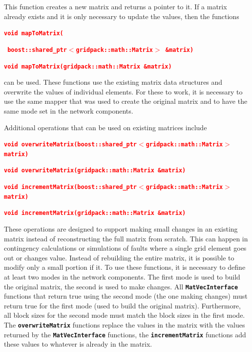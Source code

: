 \documentclass[12pt]{report} %
\begin{document}
This function creates a new matrix and returns a pointer to it. If a matrix already exists and it is only necessary to update the values, then the functions

\textcolor{red}{\texttt{\textbf{void mapToMatrix(}}}

\textcolor{red}{\texttt{\textbf{   boost::shared\_ptr$\boldsymbol{\mathrm{<}}$gridpack::math::Matrix$\boldsymbol{\mathrm{>}}$ \&matrix)}}}


\textcolor{red}{\texttt{\textbf{void mapToMatrix(gridpack::math::Matrix \&matrix)}}}

can be used. These functions use the existing matrix data structures and overwrite the values of individual elements. For these to work, it is necessary to use the same mapper that was used to create the original matrix and to have the same mode set in the network components.

Additional operations that can be used on existing matrices include

\textcolor{red}{\texttt{\textbf{void overwriteMatrix(boost::shared\_ptr$\boldsymbol{\mathrm{<}}$gridpack::math::Matrix$\boldsymbol{\mathrm{>}}$ matrix)}}}

\textcolor{red}{\texttt{\textbf{void overwriteMatrix(gridpack::math::Matrix \&matrix)}}}

\textcolor{red}{\texttt{\textbf{void incrementMatrix(boost::shared\_ptr$\boldsymbol{\mathrm{<}}$gridpack::math::Matrix$\boldsymbol{\mathrm{>}}$ matrix)}}}

\textcolor{red}{\texttt{\textbf{void incrementMatrix(gridpack::math::Matrix \&matrix)}}}

These operations are designed to support making small changes in an existing matrix instead of reconstructing the full matrix from scratch. This can happen in contingency calculations or simulations of faults where a single grid element goes out or changes value. Instead of rebuilding the entire matrix, it is possible to modify only a small portion if it. To use these functions, it is necessary to define at least two modes in the network components. The first mode is used to build the original matrix, the second is used to make changes. All \texttt{\textbf{MatVecInterface}} functions that return true using the second mode (the one making changes) must return true for the first mode (used to build the original matrix). Furthermore, all block sizes for the second mode must match the block sizes in the first mode. The \texttt{\textbf{overwriteMatrix}} functions replace the values in the matrix with the values returned by the \texttt{\textbf{MatVecInterface}} functions, the \texttt{\textbf{incrementMatrix}} functions add these values to whatever is already in the matrix.
\end{document}
